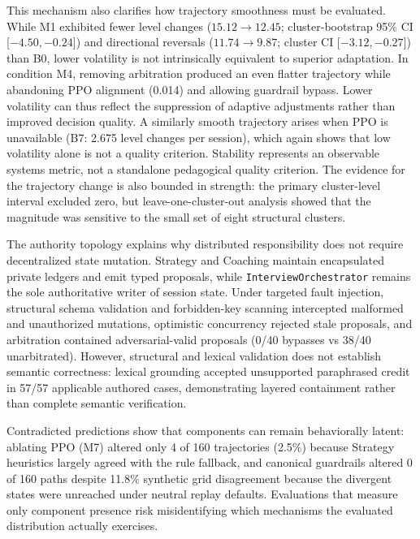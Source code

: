 \documentclass[runningheads]{llncs}
\begin{document}
This mechanism also clarifies how trajectory smoothness must be evaluated. While M1 exhibited fewer level changes ($15.12 \rightarrow 12.45$; cluster-bootstrap 95\% CI [$-4.50,-0.24$]) and directional reversals ($11.74 \rightarrow 9.87$; cluster CI [$-3.12,-0.27$]) than B0, lower volatility is not intrinsically equivalent to superior adaptation. In condition M4, removing arbitration produced an even flatter trajectory while abandoning PPO alignment (0.014) and allowing guardrail bypass. Lower volatility can thus reflect the suppression of adaptive adjustments rather than improved decision quality. A similarly smooth trajectory arises when PPO is unavailable (B7: 2.675 level changes per session), which again shows that low volatility alone is not a quality criterion. Stability represents an observable systems metric, not a standalone pedagogical quality criterion. The evidence for the trajectory change is also bounded in strength: the primary cluster-level interval excluded zero, but leave-one-cluster-out analysis showed that the magnitude was sensitive to the small set of eight structural clusters.

The authority topology explains why distributed responsibility does not require decentralized state mutation. Strategy and Coaching maintain encapsulated private ledgers and emit typed proposals, while \texttt{InterviewOrchestrator} remains the sole authoritative writer of session state. Under targeted fault injection, structural schema validation and forbidden-key scanning intercepted malformed and unauthorized mutations, optimistic concurrency rejected stale proposals, and arbitration contained adversarial-valid proposals (0/40 bypasses vs 38/40 unarbitrated). However, structural and lexical validation does not establish semantic correctness: lexical grounding accepted unsupported paraphrased credit in 57/57 applicable authored cases, demonstrating layered containment rather than complete semantic verification.

Contradicted predictions show that components can remain behaviorally latent: ablating PPO (M7) altered only 4 of 160 trajectories (2.5\%) because Strategy heuristics largely agreed with the rule fallback, and canonical guardrails altered 0 of 160 paths despite 11.8\% synthetic grid disagreement because the divergent states were unreached under neutral replay defaults. Evaluations that measure only component presence risk misidentifying which mechanisms the evaluated distribution actually exercises.
\end{document}

